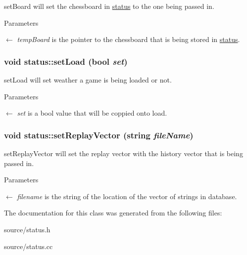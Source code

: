 setBoard will set the chessboard in \hyperlink{classstatus}{status} to the one being passed in. 
\begin{DoxyParams}{Parameters}
\item[\mbox{$\leftarrow$} {\em tempBoard}]is the pointer to the chessboard that is being stored in \hyperlink{classstatus}{status}. \end{DoxyParams}
\hypertarget{classstatus_af323bc43c9ac2c262599a7ce605a93d2}{
\subsubsection[{setLoad}]{\setlength{\rightskip}{0pt plus 5cm}void status::setLoad (bool {\em set})}}
\label{classstatus_af323bc43c9ac2c262599a7ce605a93d2}


setLoad will set weather a game is being loaded or not. 
\begin{DoxyParams}{Parameters}
\item[\mbox{$\leftarrow$} {\em set}]is a bool value that will be coppied onto load. \end{DoxyParams}
\hypertarget{classstatus_a5d04df9098e1b998605b42262e3490a8}{
\subsubsection[{setReplayVector}]{\setlength{\rightskip}{0pt plus 5cm}void status::setReplayVector (string {\em fileName})}}
\label{classstatus_a5d04df9098e1b998605b42262e3490a8}


setReplayVector will set the replay vector with the history vector that is being passed in. 
\begin{DoxyParams}{Parameters}
\item[\mbox{$\leftarrow$} {\em filename}]is the string of the location of the vector of strings in database. \end{DoxyParams}


The documentation for this class was generated from the following files:\begin{DoxyCompactItemize}
\item 
source/status.h\item 
source/status.cc\end{DoxyCompactItemize}
